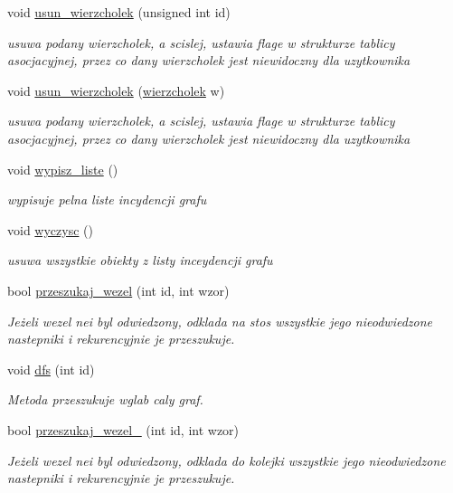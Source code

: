\begin{DoxyCompactItemize}
void \hyperlink{classgraf_a867f6b80702573ceea8dca8739bf93d8}{usun\-\_\-wierzcholek} (unsigned int id)
\begin{DoxyCompactList}\small\item\em usuwa podany wierzcholek, a scislej, ustawia flage w strukturze tablicy asocjacyjnej, przez co dany wierzcholek jest niewidoczny dla uzytkownika \end{DoxyCompactList}\item 
void \hyperlink{classgraf_a970f1f2c7883eb466a59567e81467cfe}{usun\-\_\-wierzcholek} (\hyperlink{classwierzcholek}{wierzcholek} w)
\begin{DoxyCompactList}\small\item\em usuwa podany wierzcholek, a scislej, ustawia flage w strukturze tablicy asocjacyjnej, przez co dany wierzcholek jest niewidoczny dla uzytkownika \end{DoxyCompactList}\item 
void \hyperlink{classgraf_aa4376c1891e93cac64f1b53548af8b11}{wypisz\-\_\-liste} ()
\begin{DoxyCompactList}\small\item\em wypisuje pelna liste incydencji grafu \end{DoxyCompactList}\item 
void \hyperlink{classgraf_a0aec2013836977402dc75e4c5931f09d}{wyczysc} ()
\begin{DoxyCompactList}\small\item\em usuwa wszystkie obiekty z listy inceydencji grafu \end{DoxyCompactList}\item 
bool \hyperlink{classgraf_a946364c1b0bf2ff98d1e1a5fabf6ce9b}{przeszukaj\-\_\-wezel} (int id, int wzor)
\begin{DoxyCompactList}\small\item\em Jeżeli wezel nei byl odwiedzony, odklada na stos wszystkie jego nieodwiedzone nastepniki i rekurencyjnie je przeszukuje. \end{DoxyCompactList}\item 
void \hyperlink{classgraf_ac87b0c158f92d78cc9ccaabc8ce5fcd2}{dfs} (int id)
\begin{DoxyCompactList}\small\item\em Metoda przeszukuje wglab caly graf. \end{DoxyCompactList}\item 
bool \hyperlink{classgraf_ab10b43b2e8b685118790a550674ab00e}{przeszukaj\-\_\-wezel\-\_} (int id, int wzor)
\begin{DoxyCompactList}\small\item\em Jeżeli wezel nei byl odwiedzony, odklada do kolejki wszystkie jego nieodwiedzone nastepniki i rekurencyjnie je przeszukuje. \end{DoxyCompactList}\item 

\end{DoxyCompactItemize}
